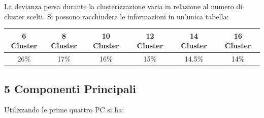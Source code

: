 La devianza persa durante la clusterizzazione varia in relazione al numero di cluster scelti. Si possono racchiudere le informazioni in un'unica tabella:
\begin{center}
	\begin{tabular}{|c|c|c|c|c|c|}
		\hline
		\textbf{6 Cluster} & \textbf{8 Cluster} & \textbf{10 Cluster} &\textbf{12 Cluster}& \textbf{14 Cluster} & \textbf{16 Cluster} \\
		\hline
		26\%& 17\% & 16\% & 15\% & 14.5\% & 14\% \\
		\hline
	\end{tabular}
\end{center}
 \subsection{5 Componenti Principali}
 Utilizzando le prime quattro PC si ha:
